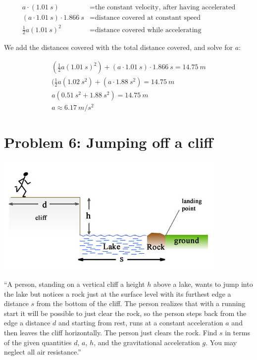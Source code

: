 \documentclass[8.01x]{subfiles}
\begin{document}
\begin{align}
a \cdot (\SI{1.01}{s}) &= \text{the constant velocity, after having accelerated}\\
(a \cdot \SI{1.01}{s}) \cdot \SI{1.866}{s} &= \text{distance covered at constant speed}\\
\frac{1}{2} a (\SI{1.01}{s})^2 &= \text{distance covered while accelerating}
\end{align}

We add the distances covered with the total distance covered, and solve for $a$:

\begin{align}
(\frac{1}{2} a (\SI{1.01}{s})^2) + (a \cdot \SI{1.01}{s}) \cdot \SI{1.866}{s} = \SI{14.75}{m}\\
(\frac{1}{2} a (\SI{1.02}{s^2}) + (a \cdot \SI{1.88}{s^2}) = \SI{14.75}{m}\\
a (\SI{0.51}{s^2} + \SI{1.88}{s^2}) = \SI{14.75}{m}\\
a \approx \SI{6.17}{m/s^2}
\end{align}

\section{Problem 6: Jumping off a cliff}

\begin{center}
\includegraphics[scale=0.75]{Graphics/h2p6}
\end{center}

``A person, standing on a vertical cliff a height $h$ above a lake, wants to jump into the lake but notices a rock just at the surface level with its furthest edge a distance $s$ from the bottom of the cliff. The person realizes that with a running start it will be possible to just clear the rock, so the person steps back from the edge a distance $d$ and starting from rest, runs at a constant acceleration $a$ and then leaves the cliff horizontally. The person just clears the rock. Find $s$ in terms of the given quantities $d$, $a$, $h$, and the gravitational acceleration $g$. You may neglect all air resistance.''
\end{document}

